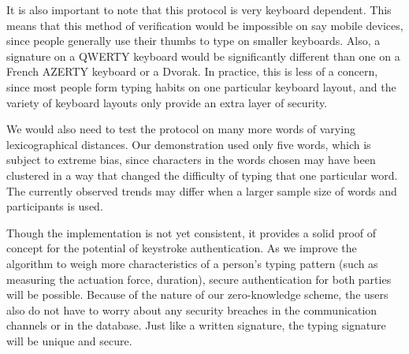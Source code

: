 \documentclass[11pt]{article}
\begin{document}
It is also important to note that this protocol is very keyboard dependent. This means that this method of verification would be impossible on say mobile devices, since people generally use their thumbs to type on smaller keyboards.  Also, a signature on a QWERTY keyboard would be significantly different than one on a French AZERTY keyboard or a Dvorak. In practice, this is less of a concern, since most people form typing habits on one particular keyboard layout, and the variety of keyboard layouts only provide an extra layer of security.

We would also need to test the protocol on many more words of varying lexicographical distances. Our demonstration used only five words, which is subject to extreme bias, since characters in the words chosen may have been clustered in a way that changed the difficulty of typing that one particular word.  The currently observed trends may differ when a larger sample size of words and participants is used.

Though the implementation is not yet consistent, it provides a solid proof of concept for the potential of keystroke authentication.  As we improve the algorithm to weigh more characteristics of a person's typing pattern (such as measuring the actuation force, duration), secure authentication for both parties will be possible. Because of the nature of our zero-knowledge scheme, the users also do not have to worry about any security breaches in the communication channels or in the database. Just like a written signature, the typing signature will be unique and secure.




\end{document}
